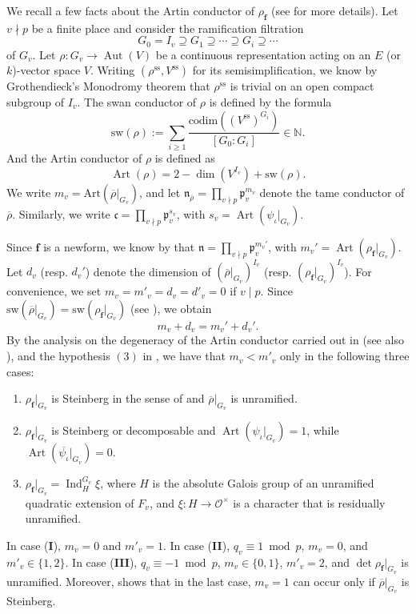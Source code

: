 \documentclass[a4paper, notitlepage, 10pt]{amsart}
\theoremstyle{plain} %
\theoremstyle{definition} %
\theoremstyle{remark} %
\numberwithin{equation}{section}
\newcommand{\Aut}{\operatorname{Aut}} %
\newcommand{\Art}{\operatorname{Art}} %
\newcommand{\Ind}{\operatorname{Ind}} %
\begin{document}
\subsubsection{} We recall a few facts about the Artin conductor of $\rho_{\mathbf{f}}$ (see \cite[\S 1]{Liv89} for more details).  Let $v\nmid p$ be a finite place and consider the ramification filtration $$G_0=I_{v}\supseteq G_1\supseteq \cdots \supseteq G_i \supseteq \cdots$$ of $G_{v}$. Let $\rho: G_{v}\rightarrow \Aut(V)$ be a continuous representation acting on an $E$ (or $k$)-vector space $V$.
Writing $(\rho^{\text{ss}},V^{\text{ss}})$ for its semisimplification, we know by Grothendieck's Monodromy theorem that $\rho^{\text{ss}}$ is trivial on an open compact subgroup of $I_{v}$. The swan conductor of $\rho$ is defined by the formula $$\text{sw}(\rho):=\sum_{i\ge 1} \frac{ \text{codim}((V^{\text{ss}})^{G_i})}{[G_0:G_i]}\in \mathbb{N}.$$ And the Artin conductor of $\rho$ is defined as
$$ \Art(\rho)= 2- \dim(V^{I_{v}})+ \text{sw}(\rho). $$
We write $m_v=\text{Art}(\overline{\rho}|_{G_{v}})$, and let  $\mathfrak{n}_{\overline{\rho}}=\prod_{v\nmid p} \mathfrak{p}_v^{m_v}$ denote the tame conductor of $\overline{\rho}$. Similarly, we write $\mathfrak{c}=\prod_{v\nmid p} \mathfrak{p}_v^{s_v}$, with $s_v=\Art(\psi_{\iota}|_{G_v})$.

 Since $\mathbf{f}$ is a newform, we know by \cite[Théorème A.]{Car} that $\mathfrak{n}=\prod_{v\nmid p} \mathfrak{p}_v^{m_{v}'}$, with $m_{v}'=\Art(\rho_{\mathbf{f}}|_{G_{v}})$.
Let $d_v$ (resp. $d_v'$) denote the dimension of $(\overline{\rho}|_{G_{v}})^{I_{v}}$ (resp. $(\rho_{\mathbf{f}}|_{G_{v}})^{I_{v}}$). For convenience, we set $m_v=m'_v=d_v=d'_v=0$ if $v\mid p$. Since $\text{sw}(\overline{\rho}|_{G_{v}})= \text{sw}(\rho_{\mathbf{{f}}}|_{G_{v}})$ (see \cite[Proposition 1.1]{Liv89}), we obtain $$m_v+d_v=m_v'+d_v'.$$
By the analysis on the degeneracy of the Artin conductor carried out in \cite[\S 1]{Car89} (see also \cite{DT94}), and the hypothesis $(3)$ in , we have that $m_v<m'_v$ only in the following three cases:
\begin{enumerate}
    \item[$\mathbf{(I)}$]  $\rho_{\mathbf{f}}|_{G_{v}}$ is Steinberg in the sense of  and $\overline{\rho}|_{G_{v}}$ is unramified.
    \item[$\mathbf{(II)}$] $\rho_{\mathbf{f}}|_{G_{v}}$ is Steinberg or decomposable and $\Art(\psi_{\iota}|_{G_v})=1$, while $\Art(\overline{\psi_{\iota}}|_{G_v})=0$.
    \item[$\mathbf{(III)}$] $\rho_{\mathbf{f}}|_{G_{v}}=\Ind_{H}^{G_v}\xi$, where $H$ is the absolute Galois group of an unramified quadratic extension of $F_v$, and $\xi\colon H\to \mathcal{O}^\times$ is a character that is residually unramified.
\end{enumerate}
In case (\textbf{I}), $m_v=0$ and $m'_v=1$. In case (\textbf{II}), $q_v\equiv 1 \bmod p$, $m_v=0$, and $m'_v\in \{1,2\}$. In case (\textbf{III}), $q_v\equiv-1\bmod p$, $m_v\in \{0,1\}$, $m'_v=2$, and $\det \rho_{\mathbf{f}}|_{G_v}$ is unramified. Moreover, \cite[Proposition 2.1-2.3]{Diamond97} shows that in the last case, $m_{v}=1$ can occur only if $\overline{\rho}|_{G_v}$ is Steinberg.
\end{document}
